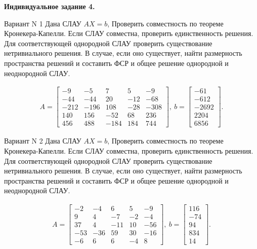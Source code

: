 \documentclass[11pt]{report}
\begin{document}
\pagestyle{empty}

{\bf Индивидуальное задание 4.}

Вариант N 1
Дана СЛАУ $AX = b$,
Проверить совместность по теореме Кронекера-Капелли. Если СЛАУ совместна, проверить единственность решения.
Для соответствующей однородной СЛАУ проверить существование нетривиального решения. В случае, если оно существует,
найти размерность пространства решений и составить ФСР и общее решение однородной  и неоднородной СЛАУ.


\begin{align*}
 A = \left[\begin{matrix}-9 & -5 & 7 & 5 & -9\\-44 & -44 & 20 & -12 & -68\\-212 & -196 & 108 & -28 & -308\\140 & 156 & -52 & 68 & 236\\456 & 488 & -184 & 184 & 744\end{matrix}\right],
\ b = \left[\begin{matrix}-61\\-612\\-2692\\2204\\6856\end{matrix}\right]. 
 \end{align*}

Вариант N 2
Дана СЛАУ $AX = b$,
Проверить совместность по теореме Кронекера-Капелли. Если СЛАУ совместна, проверить единственность решения.
Для соответствующей однородной СЛАУ проверить существование нетривиального решения. В случае, если оно существует,
найти размерность пространства решений и составить ФСР и общее решение однородной  и неоднородной СЛАУ.


\begin{align*}
 A = \left[\begin{matrix}-2 & -4 & 6 & 5 & -9\\9 & 4 & -7 & -2 & -4\\37 & 4 & -11 & 10 & -56\\-53 & -36 & 59 & 30 & -16\\-6 & 6 & 6 & -4 & 8\end{matrix}\right],
\ b = \left[\begin{matrix}116\\-74\\94\\834\\14\end{matrix}\right]. 
 \end{align*}
\end{document}
